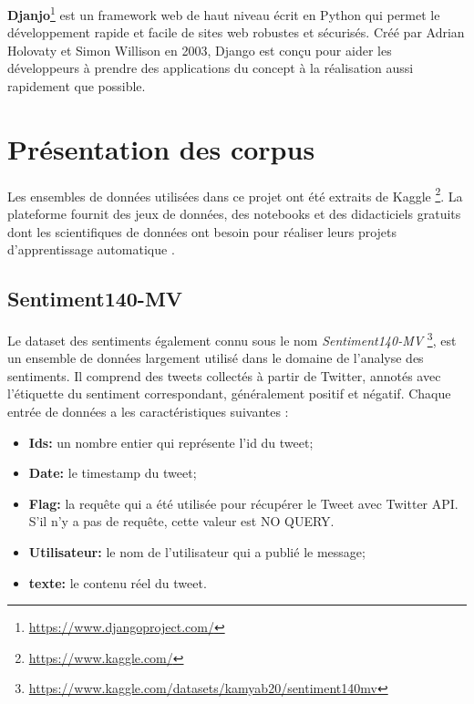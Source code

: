 \textbf{Djanjo}\footnote{\href{https://www.djangoproject.com/}{https://www.djangoproject.com/}} est un framework web de haut niveau écrit en Python qui permet le développement rapide et facile de sites web robustes et sécurisés. Créé par Adrian Holovaty et Simon Willison en 2003, Django est conçu pour aider les développeurs à prendre des applications du concept à la réalisation aussi rapidement que possible.

\section{Présentation des corpus} 
Les ensembles de données utilisées dans ce projet ont été extraits de Kaggle \footnote{\href{https://www.kaggle.com/} {https://www.kaggle.com/}}.  La plateforme fournit des jeux de données, des notebooks et des didacticiels gratuits dont les scientifiques de données ont besoin pour réaliser leurs projets d'apprentissage automatique \cite{kaggle_wiki}. 

\subsection{Sentiment140-MV }
Le dataset des sentiments également connu sous le nom  \textit{Sentiment140-MV} \footnote{\href{https://www.kaggle.com/datasets/kamyab20/sentiment140mv} {https://www.kaggle.com/datasets/kamyab20/sentiment140mv}}, est un ensemble de données largement utilisé dans le domaine de l'analyse des sentiments. Il comprend des tweets collectés à partir de Twitter, annotés avec l'étiquette du sentiment correspondant, généralement positif et négatif.  
Chaque entrée de données a les caractéristiques suivantes :
\begin{itemize}
    \item {\textbf{ Ids:}} un nombre entier qui représente l'id du tweet;
    \item {\textbf{Date:}} le timestamp du tweet; \par
    \item {\textbf{ Flag:}}  la requête qui a été utilisée pour récupérer le Tweet avec Twitter API. S'il n'y a pas de requête, cette valeur est NO QUERY. 
    \item {\textbf{Utilisateur:}} le nom de l’utilisateur qui a publié le message;
    \item {\textbf{ texte:}} le contenu réel du tweet.
\end{itemize}

